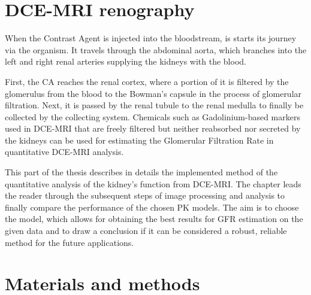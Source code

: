 \section{DCE-MRI renography}
When the Contrast Agent is injected into the bloodstream, is starts its journey via the organism. It travels  through the abdominal aorta, which branches  into the left and right renal arteries supplying the kidneys with the blood.  

First, the CA reaches the renal cortex, where a portion of it is filtered by the glomerulus from the blood to the Bowman's capsule in the process of glomerular filtration. Next, it is passed by the renal tubule to the renal medulla to finally be collected by the collecting system.   
Chemicals such as Gadolinium-based markers used in DCE-MRI that are freely filtered but neither reabsorbed nor secreted by the kidneys can be used for estimating the Glomerular Filtration Rate in quantitative DCE-MRI analysis.

This part of the thesis describes in details the implemented method of the quantitative analysis of the kidney's function from DCE-MRI. The chapter leads the reader through the subsequent steps of image processing and analysis to finally compare the performance of the chosen PK models. The aim is to choose the model, which allows for obtaining the best results for GFR estimation on the given data and to draw a conclusion if it can be considered a robust, reliable method for the future applications. 

\section{Materials and methods}
